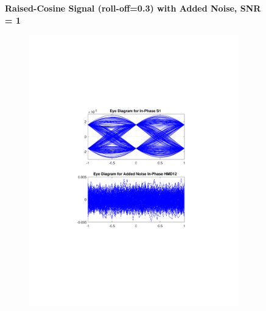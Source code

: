 \begin{figure}[H]
		\centering
	\textbf{Raised-Cosine Signal (roll-off=0.3) with Added Noise, SNR = 1}
	\begin{minipage}{\linewidth}
		\centering
	\begin{subfigure}{.45\textwidth}
		\centering
		\includegraphics[clip, trim=5cm 7cm 5cm 7cm, width=\textwidth]{./sdf/m_qam_system/figures/eyes/if_n_nmf_60_60_rc_03.pdf}
	\end{subfigure}
	\begin{subfigure}{.45\textwidth}
		\centering

\end{subfigure}
\end{minipage}
\end{figure}
